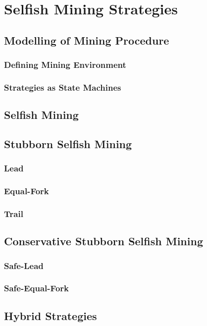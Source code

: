 \chapter{Selfish Mining Strategies}
\label{sec:strategies}
\minitoc
\vspace*{1cm}

\section{Modelling of Mining Procedure}

\subsection{Defining Mining Environment}

\subsection{Strategies as State Machines}

\section{Selfish Mining}

\section{Stubborn Selfish Mining}

\subsection{Lead}

\subsection{Equal-Fork}

\subsection{Trail}

\section{Conservative Stubborn Selfish Mining}

\subsection{Safe-Lead}

\subsection{Safe-Equal-Fork}

\section{Hybrid Strategies}